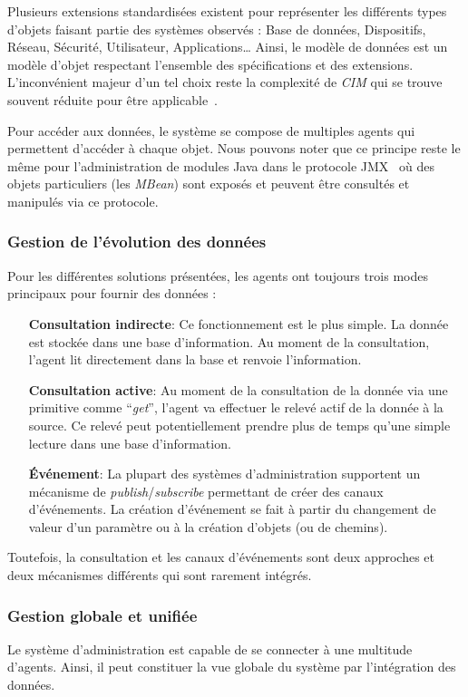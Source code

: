 Plusieurs extensions standardisées existent pour représenter les différents types d'objets faisant partie des systèmes observés : Base de données, Dispositifs, Réseau, Sécurité, Utilisateur, Applications\dots{} Ainsi, le modèle de données est un modèle d'objet respectant l'ensemble des spécifications et des extensions. L'inconvénient majeur d'un tel choix reste la complexité de \textit{CIM} qui se trouve souvent réduite pour être applicable~\cite{Lopez:datacenter}.

Pour accéder aux données, le système se compose de multiples agents qui permettent d'accéder à chaque objet. Nous pouvons noter que ce principe reste le même pour l'administration de modules Java dans le protocole JMX~\cite{Sun:JMX} où des objets particuliers (les \textit{MBean}) sont exposés et peuvent être consultés et manipulés via ce protocole.

\subsubsection{Gestion de l'évolution des données}
Pour les différentes solutions présentées, les agents ont toujours trois modes principaux pour fournir des données :
\begin{itemize}
	\item[\textbf{Consultation indirecte}: ] Ce fonctionnement est le plus simple. La donnée est stockée dans une base d'information. Au moment de la consultation, l'agent lit directement dans la base et renvoie l'information.
	\item[\textbf{Consultation active}: ] Au moment de la consultation de la donnée via une primitive comme \enquote{\it get}, l'agent va effectuer le relevé actif de la donnée à la source. Ce relevé peut potentiellement prendre plus de temps qu'une simple lecture dans une base d'information.
	\item[\textbf{Événement}: ] La plupart des systèmes d'administration supportent un mécanisme de \textit{publish}/\textit{subscribe} permettant de créer des canaux d'événements. La création d'événement se fait à partir du changement de valeur d'un paramètre ou à la création d'objets (ou de chemins).
\end{itemize}

Toutefois, la consultation et les canaux d'événements sont deux approches et deux mécanismes différents qui sont rarement intégrés.

\subsubsection{Gestion globale et unifiée}
Le système d'administration est capable de se connecter à une multitude d'agents. Ainsi, il peut constituer la vue globale du système par l'intégration des données.

